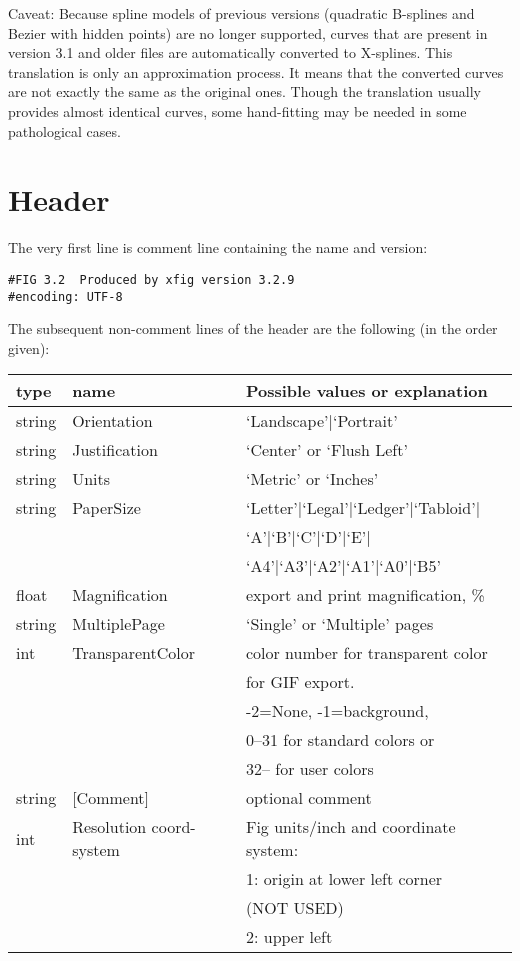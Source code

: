 \documentclass[10pt, a4paper]{article}%
\begin{document}
Caveat: Because spline models of previous versions 
(quadratic B-splines and Bezier with hidden points) 
are no longer supported, 
curves that are present in version 3.1 and older files 
are automatically converted to X-splines. 
This translation is only an approximation process. 
It means that the converted curves 
are not exactly the same as the original ones. 
Though the translation usually provides almost identical curves, 
some hand-fitting may be needed in some pathological cases. 


\section{Header}\label{sec:header}

The very first line is comment line containing the name and version: 
%
\begin{verbatim}
#FIG 3.2  Produced by xfig version 3.2.9 
#encoding: UTF-8
\end{verbatim}


The subsequent non-comment lines of the header are the following 
(in the order given): \\
%
\begin{tabular}{lll}
\toprule
type & name & Possible values or explanation \\
\midrule
\midrule
string & Orientation             & `Landscape'|`Portrait' \\
string & Justification           & `Center' or `Flush Left' \\
string & Units                   & `Metric' or `Inches' \\
string & PaperSize               & `Letter'|`Legal'|`Ledger'|`Tabloid'|\\
&&                                 `A'|`B'|`C'|`D'|`E'|\\
&&                                 `A4'|`A3'|`A2'|`A1'|`A0'|`B5' \\
float  & Magnification           & export and print magnification, \% \\
string & MultiplePage           & `Single' or `Multiple' pages \\
int    & TransparentColor       & color number for transparent color \\
&&                                 for GIF export. \\
&&                                -2=None, -1=background, \\
&&                                0--31 for standard colors or \\
&&                                32-- for user colors \\
string & [Comment]              & optional comment \\%
int    & Resolution coord-system & Fig units/inch and coordinate system:\\
&&                                 1: origin at lower left corner \\
&&                                    (NOT USED)\\
&&                                 2: upper left \\
\bottomrule
\end{tabular}
\end{document}
